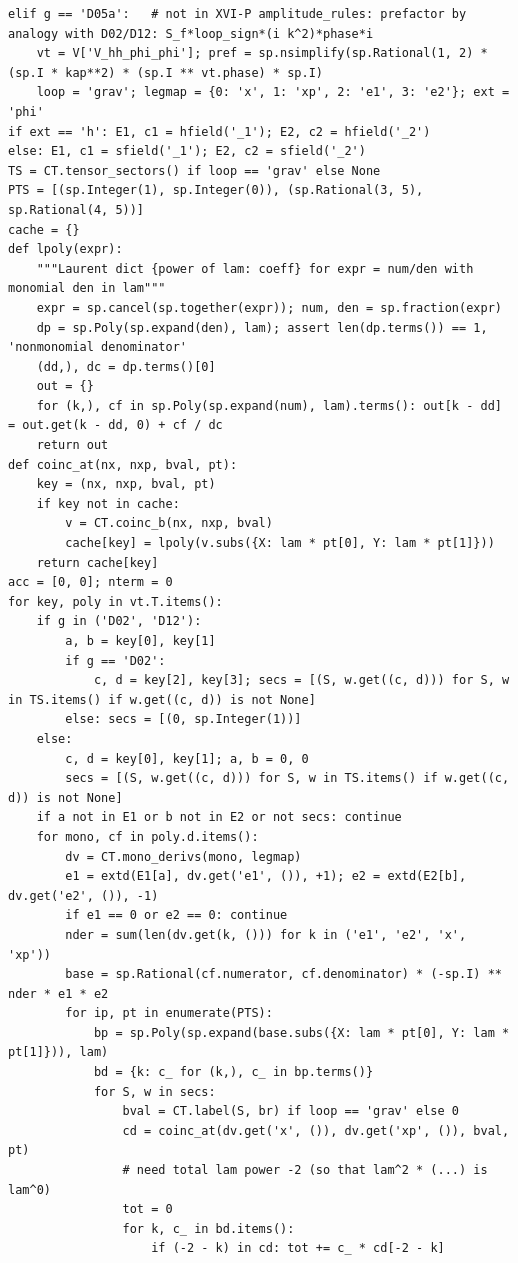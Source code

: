 \documentclass[10pt]{article}
\begin{document}
\begin{lstlisting}
elif g == 'D05a':   # not in XVI-P amplitude_rules: prefactor by analogy with D02/D12: S_f*loop_sign*(i k^2)*phase*i
    vt = V['V_hh_phi_phi']; pref = sp.nsimplify(sp.Rational(1, 2) * (sp.I * kap**2) * (sp.I ** vt.phase) * sp.I)
    loop = 'grav'; legmap = {0: 'x', 1: 'xp', 2: 'e1', 3: 'e2'}; ext = 'phi'
if ext == 'h': E1, c1 = hfield('_1'); E2, c2 = hfield('_2')
else: E1, c1 = sfield('_1'); E2, c2 = sfield('_2')
TS = CT.tensor_sectors() if loop == 'grav' else None
PTS = [(sp.Integer(1), sp.Integer(0)), (sp.Rational(3, 5), sp.Rational(4, 5))]
cache = {}
def lpoly(expr):
    """Laurent dict {power of lam: coeff} for expr = num/den with monomial den in lam"""
    expr = sp.cancel(sp.together(expr)); num, den = sp.fraction(expr)
    dp = sp.Poly(sp.expand(den), lam); assert len(dp.terms()) == 1, 'nonmonomial denominator'
    (dd,), dc = dp.terms()[0]
    out = {}
    for (k,), cf in sp.Poly(sp.expand(num), lam).terms(): out[k - dd] = out.get(k - dd, 0) + cf / dc
    return out
def coinc_at(nx, nxp, bval, pt):
    key = (nx, nxp, bval, pt)
    if key not in cache:
        v = CT.coinc_b(nx, nxp, bval)
        cache[key] = lpoly(v.subs({X: lam * pt[0], Y: lam * pt[1]}))
    return cache[key]
acc = [0, 0]; nterm = 0
for key, poly in vt.T.items():
    if g in ('D02', 'D12'):
        a, b = key[0], key[1]
        if g == 'D02':
            c, d = key[2], key[3]; secs = [(S, w.get((c, d))) for S, w in TS.items() if w.get((c, d)) is not None]
        else: secs = [(0, sp.Integer(1))]
    else:
        c, d = key[0], key[1]; a, b = 0, 0
        secs = [(S, w.get((c, d))) for S, w in TS.items() if w.get((c, d)) is not None]
    if a not in E1 or b not in E2 or not secs: continue
    for mono, cf in poly.d.items():
        dv = CT.mono_derivs(mono, legmap)
        e1 = extd(E1[a], dv.get('e1', ()), +1); e2 = extd(E2[b], dv.get('e2', ()), -1)
        if e1 == 0 or e2 == 0: continue
        nder = sum(len(dv.get(k, ())) for k in ('e1', 'e2', 'x', 'xp'))
        base = sp.Rational(cf.numerator, cf.denominator) * (-sp.I) ** nder * e1 * e2
        for ip, pt in enumerate(PTS):
            bp = sp.Poly(sp.expand(base.subs({X: lam * pt[0], Y: lam * pt[1]})), lam)
            bd = {k: c_ for (k,), c_ in bp.terms()}
            for S, w in secs:
                bval = CT.label(S, br) if loop == 'grav' else 0
                cd = coinc_at(dv.get('x', ()), dv.get('xp', ()), bval, pt)
                # need total lam power -2 (so that lam^2 * (...) is lam^0)
                tot = 0
                for k, c_ in bd.items():
                    if (-2 - k) in cd: tot += c_ * cd[-2 - k]

\end{lstlisting}
\end{document}
